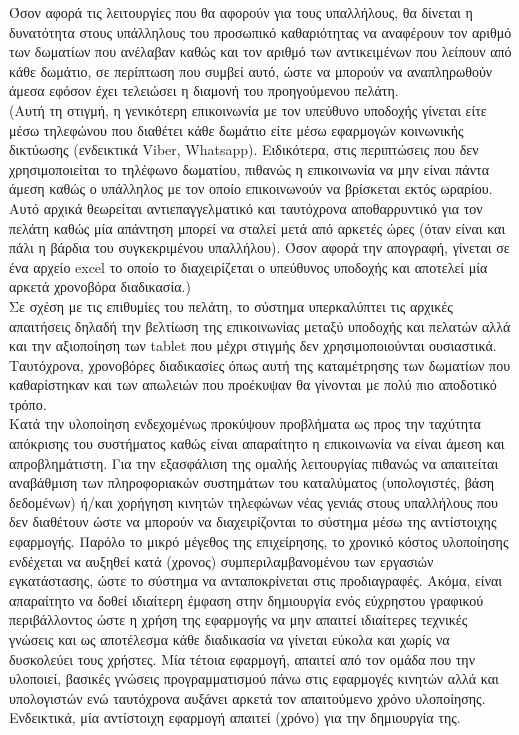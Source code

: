 		\noindent
		Όσον αφορά τις λειτουργίες που θα αφορούν για τους υπαλλήλους, θα δίνεται η δυνατότητα στους υπάλληλους του προσωπικό καθαριότητας να αναφέρουν τον αριθμό των δωματίων που ανέλαβαν καθώς και τον αριθμό των αντικειμένων που λείπουν από κάθε δωμάτιο, σε περίπτωση που συμβεί αυτό, ώστε να μπορούν να αναπληρωθούν άμεσα εφόσον έχει τελειώσει η διαμονή του προηγούμενου πελάτη. \\
		
		\noindent
		(Αυτή τη στιγμή, η γενικότερη επικοινωνία με τον υπεύθυνο υποδοχής γίνεται είτε μέσω τηλεφώνου που διαθέτει κάθε δωμάτιο είτε μέσω εφαρμογών κοινωνικής δικτύωσης (ενδεικτικά Viber, Whatsapp). Ειδικότερα, στις περιπτώσεις που δεν χρησιμοποιείται το τηλέφωνο δωματίου, πιθανώς η επικοινωνία να μην είναι πάντα άμεση καθώς ο υπάλληλος με τον οποίο επικοινωνούν να βρίσκεται εκτός ωραρίου. Αυτό αρχικά θεωρείται αντιεπαγγελματικό και ταυτόχρονα αποθαρρυντικό για τον πελάτη καθώς μία απάντηση μπορεί να σταλεί μετά από αρκετές ώρες (όταν είναι και πάλι η βάρδια του συγκεκριμένου υπαλλήλου). Όσον αφορά την απογραφή, γίνεται σε ένα αρχείο excel το οποίο το  διαχειρίζεται ο υπεύθυνος υποδοχής και αποτελεί μία αρκετά χρονοβόρα διαδικασία.) \\
		
		\noindent
		Σε σχέση με τις επιθυμίες του πελάτη, το σύστημα υπερκαλύπτει τις αρχικές απαιτήσεις δηλαδή την βελτίωση της επικοινωνίας μεταξύ υποδοχής και πελατών αλλά και την αξιοποίηση των tablet που μέχρι στιγμής δεν χρησιμοποιούνται ουσιαστικά. Ταυτόχρονα, χρονοβόρες διαδικασίες όπως αυτή της καταμέτρησης των δωματίων που καθαρίστηκαν και των απωλειών που προέκυψαν θα γίνονται με πολύ πιο αποδοτικό τρόπο. \\
		
		\newpage
		\noindent
		Κατά την υλοποίηση ενδεχομένως προκύψουν προβλήματα ως προς την ταχύτητα απόκρισης του συστήματος καθώς είναι απαραίτητο η επικοινωνία να είναι άμεση και απροβλημάτιστη. Για την εξασφάλιση της ομαλής λειτουργίας πιθανώς να απαιτείται αναβάθμιση των πληροφοριακών συστημάτων του καταλύματος (υπολογιστές, βάση δεδομένων) ή/και χορήγηση κινητών τηλεφώνων νέας γενιάς στους υπαλλήλους που δεν διαθέτουν ώστε  να μπορούν να διαχειρίζονται το σύστημα μέσω της αντίστοιχης εφαρμογής. Παρόλο το μικρό μέγεθος της επιχείρησης, το χρονικό κόστος υλοποίησης ενδέχεται να αυξηθεί κατά (χρονος) συμπεριλαμβανομένου των εργασιών εγκατάστασης, ώστε το σύστημα να ανταποκρίνεται στις προδιαγραφές.
		Ακόμα, είναι απαραίτητο να δοθεί ιδιαίτερη έμφαση στην δημιουργία ενός εύχρηστου γραφικού περιβάλλοντος ώστε η χρήση της εφαρμογής να μην απαιτεί ιδιαίτερες τεχνικές γνώσεις και ως αποτέλεσμα κάθε διαδικασία να γίνεται εύκολα και χωρίς να δυσκολεύει τους χρήστες. Μία τέτοια εφαρμογή, απαιτεί από τον ομάδα που την υλοποιεί, βασικές γνώσεις προγραμματισμού πάνω στις εφαρμογές κινητών αλλά και υπολογιστών ενώ ταυτόχρονα αυξάνει αρκετά τον απαιτούμενο χρόνο υλοποίησης. Ενδεικτικά, μία αντίστοιχη εφαρμογή  απαιτεί (χρόνο) για την δημιουργία της.\\ 
		
